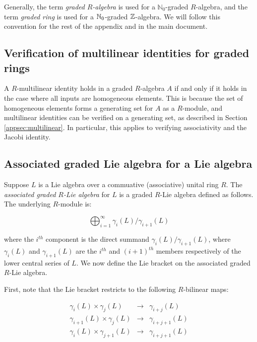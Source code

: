 Generally, the term {\em graded $R$-algebra} is used for a
$\mathbb{N}_0$-graded $R$-algebra, and the term {\em graded ring} is
used for a $\mathbb{N}_0$-graded $\mathbb{Z}$-algebra. We will follow this convention
for the rest of the appendix and in the main document.

\subsection{Verification of multilinear identities for graded rings}\label{appsec:multilinear-graded}

A $R$-multilinear identity holds in a graded $R$-algebra $A$ if and
only if it holds in the case where all inputs are homogeneous
elements. This is because the set of homogeneous elements forms a
generating set for $A$ as a $R$-module, and multilinear
identities can be verified on a generating set, as described in
Section \ref{appsec:multilinear}. In particular, this applies to
verifying associativity and the Jacobi identity.

\subsection{Associated graded Lie algebra for a Lie algebra}\label{appsec:associated-graded-lie}

Suppose $L$ is a Lie algebra over a commuative (associative) unital
ring $R$. The {\em associated graded $R$-Lie algebra} for $L$ is a
graded $R$-Lie algebra defined as follows. The underlying $R$-module
is:

$$\bigoplus_{i=1}^\infty \gamma_i(L)/\gamma_{i+1}(L)$$

where the $i^{th}$ component is the direct summand
$\gamma_i(L)/\gamma_{i+1}(L)$, where $\gamma_i(L)$ and
$\gamma_{i+1}(L)$ are the $i^{th}$ and $(i+1)^{th}$ members
respectively of the lower central series of $L$. We now define the Lie
bracket on the associated graded $R$-Lie algebra.

First, note that the Lie bracket restricts to the following
$R$-bilinear maps:

\begin{eqnarray*}
  \gamma_i(L) \times \gamma_j(L) & \to & \gamma_{i+j}(L)\\
  \gamma_{i+1}(L) \times \gamma_j(L) & \to & \gamma_{i+j+1}(L)\\
  \gamma_i(L) \times \gamma_{j+1}(L) & \to & \gamma_{i+j+1}(L)\\
\end{eqnarray*}

